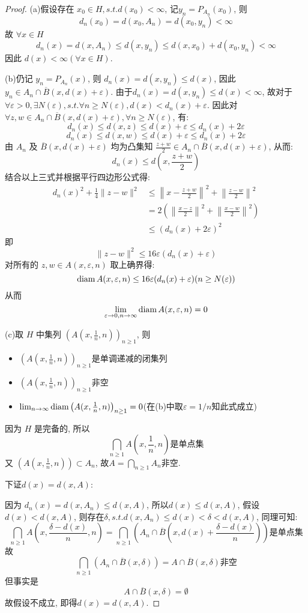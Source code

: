 \begin{proof}
(a)假设存在 $x_0\in H,s.t.d(x_0)<\infty$, 记$y_n=P_{A_n}(x_0)$, 则
\[d_n(x_0)=d(x_0,A_n)=d(x_0,y_n)<\infty\]
故 $\forall x\in H$
\[d_n(x)=d(x,A_n)\leq d(x,y_n)\leq d(x,x_0)+d(x_0,y_n)<\infty\]
因此 $d(x)<\infty(\forall x\in H)$.

(b)仍记 $y_n=P_{A_n}(x)$, 则 $d_n(x)=d(x,y_n)\leq d(x)$, 因此$y_n\in A_n\cap\overline{B}(x,d(x)+\varepsilon)$. 由于$d_n(x)=d(x,y_n)\leq d(x)<\infty$, 故对于$\forall\varepsilon>0,\exists N(\varepsilon),s.t.\forall n\geq N(\varepsilon),d(x)<d_n(x)+\varepsilon$. 因此对$\forall z,w\in A_n\cap\overline{B}(x,d(x)+\varepsilon),\forall n\geq N(\varepsilon)$, 有:
\[d_n(x)\leq d(x,z)\leq d(x)+\varepsilon\leq d_n(x)+2\varepsilon\]
\[d_n(x)\leq d(x,w)\leq d(x)+\varepsilon\leq d_n(x)+2\varepsilon\]
由 $A_n$ 及 $\overline{B}(x,d(x)+\varepsilon)$ 均为凸集知 $\frac{z+w}{2}\in A_n\cap\overline{B}(x,d(x)+\varepsilon)$, 从而:
\[d_n(x)\leq d\left(x,\frac{z+w}{2}\right)\]
结合以上三式并根据平行四边形公式得:
\[\begin{split}
d_n(x)^2+\frac{1}{4}\|z-w\|^2
&\leq\left\|x-\frac{z+w}{2}\right\|^2+\left\|\frac{z-w}{2}\right\|^2\\
&=2\left(\left\|\frac{x-z}{2}\right\|^2+\left\|\frac{x-w}{2}\right\|^2\right)\\
&\leq (d_n(x)+2\varepsilon)^2\end{split}\]
即
\[\|z-w\|^2\leq 16\varepsilon(d_n(x)+\varepsilon)\]
对所有的 $z,w\in A(x,\varepsilon,n)$ 取上确界得:
\[\operatorname{diam} A(x,\varepsilon,n)\leq 16\varepsilon(d_n(x)+\varepsilon)(n\geq N(\varepsilon))\]
从而
\[\lim\limits_{\varepsilon\to 0,n\to\infty}\operatorname{diam} A(x,\varepsilon,n)=0\]

(c)取 $H$ 中集列 $\left(A(x,\frac{1}{n},n)\right)_{n\geq 1}$, 则
\begin{itemize}
\item $\left(A(x,\frac{1}{n},n)\right)_{n\geq 1}$是单调递减的闭集列
\item $\left(A(x,\frac{1}{n},n)\right)_{n\geq 1}$非空
\item $\lim_{n\to\infty}\operatorname{diam}\left(A(x,\frac{1}{n},n)\right)_{n\geq 1}=0$(在(b)中取$\varepsilon=1/n$知此式成立)
\end{itemize}
因为 $H$ 是完备的, 所以
\[\bigcap_{n\geq 1}A\left(x,\frac{1}{n},n\right)\text{是单点集}\]
又 $\left(A(x,\frac{1}{n},n)\right)\subset A_n$, 故$A=\bigcap_{n\geq 1}A_n$非空.

下证$d(x)=d(x,A)$:

因为 $d_n(x)=d(x,A_n)\leq d(x,A)$, 所以$d(x)\leq d(x,A)$, 假设$d(x)<d(x,A)$, 则存在$\delta,s.t.d(x,A_n)\leq d(x)<\delta<d(x,A)$, 同理可知:
\[\bigcap_{n\geq 1}A\left(x,\frac{\delta-d(x)}{n},n\right)=\bigcap_{n\geq 1}\left(A_n\cap\overline{B}\left(x,d(x)+\frac{\delta-d(x)}{n}\right)\right)\text{是单点集}\]
故
\[\bigcap_{n\geq 1}\left(A_n\cap\overline{B}\left(x,\delta\right)\right)=A\cap\overline{B}(x,\delta)\text{非空}\]
但事实是
\[A\cap\overline{B}(x,\delta)=\emptyset\]
故假设不成立, 即得$d(x)=d(x,A)$.
\end{proof}




